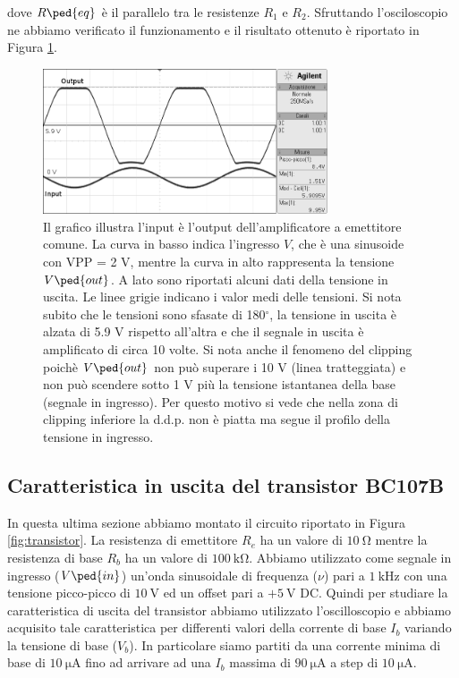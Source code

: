 dove $R\ped{eq}$ è il parallelo tra le resistenze $R_1$ e $R_2$.
Sfruttando l'osciloscopio ne abbiamo verificato il funzionamento e il risultato ottenuto è riportato in Figura \ref{fig:amp}.

\begin{figure}[t!]
	\centering
	\includegraphics[width=0.75\textwidth]{g.png}
	\caption{Il grafico illustra l'input è l'output dell'amplificatore a emettitore comune. La curva in basso indica l'ingresso $V$,
		che è una sinusoide con VPP = 2 V, mentre la curva in alto rappresenta la tensione $V\ped{out}$. A lato sono riportati alcuni dati della tensione in uscita.
		Le linee grigie indicano i valor medi delle tensioni. Si nota subito che le tensioni sono
		sfasate di 180$^\circ$, la tensione in uscita è alzata di 5.9 V rispetto all'altra e che il segnale in uscita è amplificato di circa 10 volte.
		Si nota anche il fenomeno del clipping poichè $V\ped{out}$ non può superare i 10 V (linea tratteggiata) e non può scendere sotto 1 V più
		la tensione istantanea della base (segnale in ingresso). Per questo motivo si vede che nella zona di clipping inferiore la d.d.p.
		non è piatta ma segue il profilo della tensione in ingresso.}
	\label{fig:amp}
\end{figure}

\subsection*{Caratteristica in uscita del transistor BC107B}

In questa ultima sezione abbiamo montato il circuito riportato in Figura \ref{fig:transistor}. La resistenza di emettitore $R_e$ ha un valore di $\SI{10}{\ohm}$ mentre la resistenza di base $R_b$ ha un valore di $\SI{100}{\kilo\ohm}$. Abbiamo utilizzato come segnale in ingresso ($V\ped{in}$) un'onda sinusoidale di frequenza ($\nu$) pari a $\SI{1}{\kilo\hertz}$ con una tensione picco-picco di $\SI{10}{\volt}$ ed un offset pari a $+\SI{5}{\volt}$ DC.
Quindi per studiare la caratteristica di uscita del transistor abbiamo utilizzato l'oscilloscopio e abbiamo acquisito tale caratteristica per differenti valori della corrente di base $I_b$ variando la tensione di base ($V_b$). In particolare siamo partiti da una corrente minima di base di $\SI{10}{\micro\ampere}$ fino ad arrivare ad una $I_b$ massima di $\SI{90}{\micro\ampere}$ a step di $\SI{10}{\micro\ampere}$.


